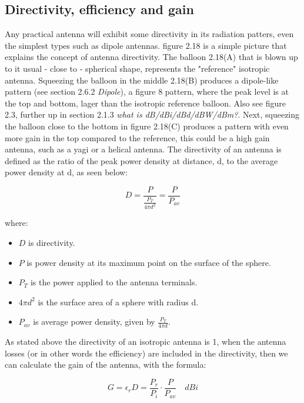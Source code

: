 \subsection{Directivity, efficiency and gain}
Any practical antenna will exhibit some directivity in its radiation patters, even the simplest types such as dipole antennas. figure 2.18 is a simple picture that explains the concept of antenna directivity. The balloon 2.18(A) that is blown up to it usual - close to - spherical shape, represents the "reference" isotropic antenna. Squeezing the balloon in the middle 2.18(B) produces a dipole-like pattern (see section 2.6.2 \textit{Dipole}), a figure 8 pattern, where the peak level is at the top and bottom, lager than the isotropic reference balloon. Also see figure 2.3, further up in section 2.1.3 \textit{what is dB/dBi/dBd/dBW/dBm?}. Next, squeezing the balloon close to the bottom in figure 2.18(C) produces a pattern with even more gain in the top compared to the reference, this could be a high gain antenna, such as a yagi or a helical antenna. The directivity of an antenna is defined as the ratio of the peak power density at distance, d, to the average power density at d, as seen below:  

\begin{equation}
    D = \frac{P}{\frac{P_T}{4 \pi d^2}} = \frac{P}{P_{av}} 
\end{equation}

where:

\begin{itemize}
  \item $D$ is directivity.
  \item $P$ is power density at its maximum point on the surface of the sphere.
  \item $P_T$ is the power applied to the antenna terminals.
  \item $4 \pi d^2$ is the surface area of a sphere with radius d.
  \item $P_{av}$ is average power density, given by $\frac{P_T}{4 \pi d}$.
\end{itemize}

As stated above the directivity of an isotropic antenna is 1, when the antenna losses (or in other words the efficiency) are included in the directivity, then we can calculate the gain of the antenna, with the formula:

\begin{equation}
    G = \epsilon_r D = \frac{P_r}{P_i}\cdot\frac{P}{P_{av}} \quad dBi
\end{equation}

